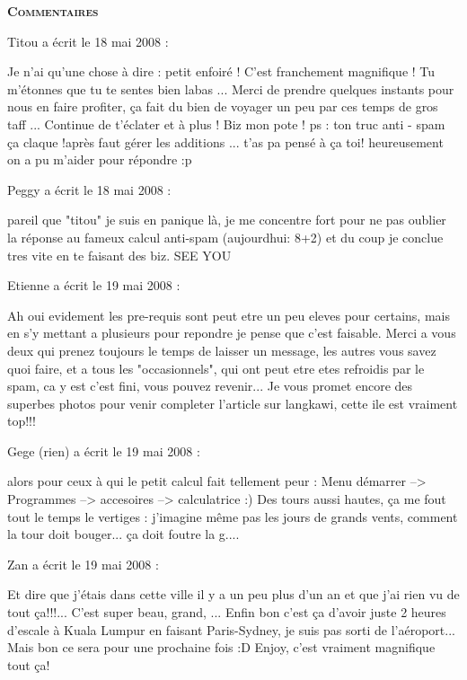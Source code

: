 \bigskip
\textbf{\textsc{Commentaires}}

 \medskip
Titou a écrit le 18 mai 2008 :
\begin{displayquote}
Je n'ai qu'une chose à dire : petit enfoiré ! C'est franchement magnifique ! Tu m'étonnes que tu te sentes bien labas ... Merci de prendre quelques instants pour nous en faire profiter, ça fait du bien de voyager un peu par ces temps de gros taff ... Continue de t'éclater et à plus ! Biz mon pote !
ps : ton truc anti - spam ça claque !après faut gérer les additions ... t'as pa pensé à ça toi! heureusement on a pu m'aider pour répondre :p
\end{displayquote}

 \medskip
Peggy a écrit le 18 mai 2008 :
\begin{displayquote}
pareil que "titou" je suis en panique là, je me concentre fort pour ne pas oublier la réponse au fameux calcul anti-spam (aujourdhui: 8+2) et du coup je conclue tres vite en te faisant des biz.
SEE YOU
\end{displayquote}

 \medskip
Etienne a écrit le 19 mai 2008 :
\begin{displayquote}
Ah oui evidement les pre-requis sont peut etre un peu eleves pour certains, mais en s'y mettant a plusieurs pour repondre je pense que c'est faisable.
Merci a vous deux qui prenez toujours le temps de laisser un message, les autres vous savez quoi faire, et a tous les "occasionnels", qui ont peut etre etes refroidis par le spam, ca y est c'est fini, vous pouvez revenir...
Je vous promet encore des superbes photos pour venir completer l'article sur langkawi, cette ile est vraiment top!!!
\end{displayquote}

 \medskip
Gege (rien) a écrit le 19 mai 2008 :
\begin{displayquote}
alors pour ceux à qui le petit calcul fait tellement peur : Menu démarrer --> Programmes --> accesoires --> calculatrice :)
Des tours aussi hautes, ça me fout tout le temps le vertiges : j'imagine même pas les jours de grands vents, comment la tour doit bouger... ça doit foutre la g....
\end{displayquote}

 \medskip
Zan a écrit le 19 mai 2008 :
\begin{displayquote}
Et dire que j'étais dans cette ville il y a un peu plus d'un an et que j'ai rien vu de tout ça!!!... C'est super beau, grand, ...
Enfin bon c'est ça d'avoir juste 2 heures d'escale à Kuala Lumpur en faisant Paris-Sydney, je suis pas sorti de l'aéroport... Mais bon ce sera pour une prochaine fois :D
Enjoy, c'est vraiment magnifique tout ça!
\end{displayquote}

